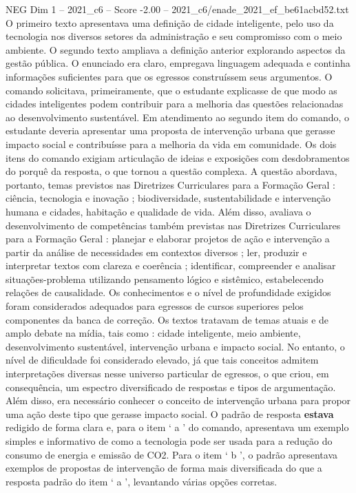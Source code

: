\begin{textsample}{NEG Dim 1 – 2021\_c6 – Score -2.00 – 2021\_c6/enade\_2021\_ef\_be61acbd52.txt}
O primeiro texto apresentava uma definição de cidade inteligente, pelo uso da tecnologia nos diversos setores da administração e seu compromisso com o meio ambiente.
O segundo texto ampliava a definição anterior explorando aspectos da gestão pública.
O enunciado era claro, empregava linguagem adequada e continha informações suficientes para que os egressos construíssem seus argumentos.
O comando solicitava, primeiramente, que o estudante explicasse de que modo as cidades inteligentes podem contribuir para a melhoria das questões relacionadas ao desenvolvimento sustentável.
Em atendimento ao segundo item do comando, o estudante deveria apresentar uma proposta de intervenção urbana que gerasse impacto social e contribuísse para a melhoria da vida em comunidade.
Os dois itens do comando exigiam articulação de ideias e exposições com desdobramentos do porquê da resposta, o que tornou a questão complexa.
A questão abordava, portanto, temas previstos nas Diretrizes Curriculares para a Formação Geral : ciência, tecnologia e inovação ; biodiversidade, sustentabilidade e intervenção humana e cidades, habitação e qualidade de vida.
Além disso, avaliava o desenvolvimento de competências também previstas nas Diretrizes Curriculares para a Formação Geral : planejar e elaborar projetos de ação e intervenção a partir da análise de necessidades em contextos diversos ; ler, produzir e interpretar textos com clareza e coerência ; identificar, compreender e analisar situações-problema utilizando pensamento lógico e sistêmico, estabelecendo relações de causalidade.
Os conhecimentos e o nível de profundidade exigidos foram considerados adequados para egressos de cursos superiores pelos componentes da banca de correção.
Os textos tratavam de temas atuais e de amplo debate na mídia, tais como : cidade inteligente, meio ambiente, desenvolvimento sustentável, intervenção urbana e impacto social.
No entanto, o nível de dificuldade foi considerado elevado, já que tais conceitos admitem interpretações diversas nesse universo particular de egressos, o que criou, em consequência, um espectro diversificado de respostas e tipos de argumentação.
Além disso, era necessário conhecer o conceito de intervenção urbana para propor uma ação deste tipo que gerasse impacto social.
O padrão de resposta \textbf{estava} redigido de forma clara e, para o item ‘ a ’ do comando, apresentava um exemplo simples e informativo de como a tecnologia pode ser usada para a redução do consumo de energia e emissão de CO2.
Para o item ‘ b ’, o padrão apresentava exemplos de propostas de intervenção de forma mais diversificada do que a resposta padrão do item ‘ a ’, levantando várias opções corretas.

\end{textsample}

